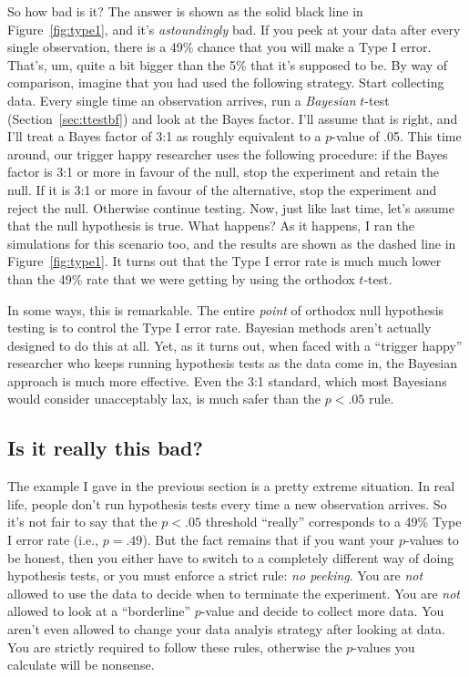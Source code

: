 So how bad is it? The answer is shown as the solid black line in Figure~\ref{fig:type1}, and it's {\it astoundingly} bad. If you peek at your data after every single observation, there is a 49\% chance that you will make a Type I error. That's, um, quite a bit bigger than the 5\% that it's supposed to be. By way of comparison, imagine that you had used the following strategy. Start collecting data. Every single time an observation arrives, run a {\it Bayesian} $t$-test (Section~\ref{sec:ttestbf}) and look at the Bayes factor. I'll assume that \textcite{Johnson2013} is right, and I'll treat a Bayes factor of 3:1 as roughly equivalent to a $p$-value of .05. This time around, our trigger happy researcher uses the following procedure: if the Bayes factor is 3:1 or more in favour of the null, stop the experiment and retain the null. If it is 3:1 or more in favour of the alternative, stop the experiment and reject the null. Otherwise continue testing. Now, just like last time, let's assume that the null hypothesis is true. What happens? As it happens, I ran the simulations for this scenario too, and the results are shown as the dashed line in Figure~\ref{fig:type1}. It turns out that the Type I error rate is much much lower than the 49\% rate that we were getting by using the orthodox $t$-test.

In some ways, this is remarkable. The entire {\it point} of orthodox null hypothesis testing is to control the Type I error rate. Bayesian methods aren't actually designed to do this at all. Yet, as it turns out, when faced with a ``trigger happy'' researcher who keeps running hypothesis tests as the data come in, the Bayesian approach is much more effective. Even the 3:1 standard, which most Bayesians would consider unacceptably lax, is much safer than the $p<.05$ rule. 


\subsection{Is it really this bad?}

The example I gave in the previous section is a pretty extreme situation. In real life, people don't run hypothesis tests every time a new observation arrives. So it's not fair to say that the $p<.05$ threshold ``really'' corresponds to a 49\% Type I error rate (i.e., $p=.49$). But the fact remains that if you want your $p$-values to be honest, then you either have to switch to a completely different way of doing hypothesis tests, or you must enforce a strict rule: {\it no peeking}. You are {\it not} allowed to use the data to decide when to terminate the experiment. You are {\it not} allowed to look at a ``borderline'' $p$-value and decide to collect more data. You aren't even allowed to change your data analyis strategy after looking at data. You are strictly required to follow these rules, otherwise the $p$-values you calculate will be nonsense.

